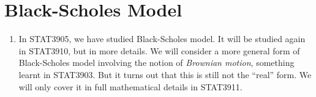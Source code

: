 \section{Black-Scholes Model}
\label{sect:bs-model}
\begin{enumerate}
\item In STAT3905, we have studied Black-Scholes model. It will be studied
again in STAT3910, but in more details. We will consider a more general form of
Black-Scholes model involving the notion of \emph{Brownian motion}, something
learnt in STAT3903. But it turns out that this is still not the ``real'' form.
We will only cover it in full mathematical details in STAT3911.
\end{enumerate}
